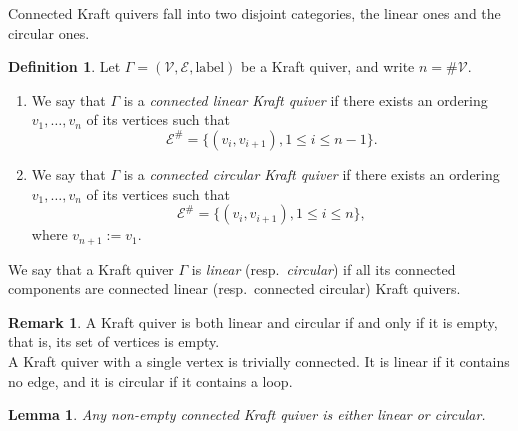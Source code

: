 \documentclass[12pt]{amsart}
\newtheorem{lemma}[theorem]{Lemma}
\theoremstyle{definition}
\newtheorem{definition}[theorem]{Definition}
\newtheorem{remark}[theorem]{Remark}
\newcommand{\<}{\langle}   %
\renewcommand{\>}{\rangle} %
\begin{document}
Connected Kraft quivers fall into two disjoint categories, the linear ones and the circular ones. 

\begin{definition}\label{DefLinCirc}
    Let $\Gamma= (\mathcal V, \mathcal E, \mathrm{label})$ be a Kraft quiver, and write $n = \#\mathcal V$. 
    \begin{enumerate}
        \item We say that $\Gamma$ is a \textit{connected linear Kraft quiver} if there exists an ordering $v_1,\ldots , v_n$ of its vertices such that 
        \begin{equation*}
            \mathcal E^{\#} = \{(v_i,v_{i+1}), 1 \leq i \leq n-1\}.
        \end{equation*}
        \item We say that $\Gamma$ is a \textit{connected circular Kraft quiver} if there exists an ordering $v_1,\ldots , v_n$ of its vertices such that 
        \begin{equation*}
            \mathcal E^{\#} = \{(v_i,v_{i+1}), 1 \leq i \leq n\},
        \end{equation*}
        where $v_{n+1} := v_1$.
    \end{enumerate}
    We say that a Kraft quiver $\Gamma$ is \textit{linear} (resp.~\textit{circular}) if all its connected components are connected linear (resp.~connected circular) Kraft quivers.
\end{definition}

\begin{remark}
    A Kraft quiver is both linear and circular if and only if it is empty, that is, its set of vertices is empty.\\
    A Kraft quiver with a single vertex is trivially connected. It is linear if it contains no edge, and it is circular if it contains a loop. 
\end{remark}

\begin{lemma}
Any non-empty connected Kraft quiver is either linear or circular.    
\end{lemma}
\end{document}
